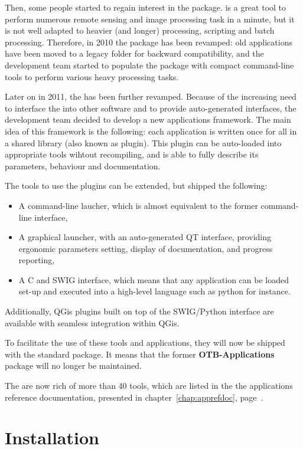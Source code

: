 Then, some people started to regain interest in the \app
package. \mont is a great tool to perform numerous remote sensing and
image processing task in a minute, but it is not well adapted to
heavier (and longer) processing, scripting and batch
processing. Therefore, in 2010 the \app package has been revamped: old
applications have been moved to a legacy folder for backward
compatibility, and the development team started to populate the
package with compact command-line tools to perform various heavy
processing tasks. 

Later on in 2011, the \app has been further revamped. Because of the
increasing need to interface the \app into other software and to
provide auto-generated interfaces, the \otb development team decided
to develop a new applications framework. The main idea of this
framework is the following: each application is written once for all
in a shared library (also known as plugin). This plugin can be
auto-loaded into appropriate tools wihtout recompiling, and is able to
fully describe its parameters, behaviour and documentation.

The tools to use the plugins can be extended, but \otb shipped the
following:
\begin{itemize}
\item A command-line laucher, which is almost equivalent to the former
  \app command-line interface,
\item A graphical launcher, with an auto-generated QT interface,
  providing ergonomic parameters setting, display of documentation,
  and progress reporting,
\item A C and SWIG interface, which means that any application can be
  loaded set-up and executed into a high-level language such as python
  for instance.
\end{itemize}

Additionally, QGis plugins built on top of the SWIG/Python interface
are available with seamless integration within QGis.

To facilitate the use of these tools and applications, they will now
be shipped with the standard \otb package. It means that the former
\textbf{OTB-Applications} package will no longer be maintained.

The \app are now rich of more than 40 tools, which are listed in the
the applications reference documentation, presented in
chapter~\ref{chap:apprefdoc}, page~\pageref{chap:apprefdoc}.

\section{Installation}\label{sec:appinstall}


